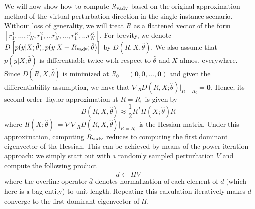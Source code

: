 \documentclass[journal,twoside,web]{ieeecolor}
\begin{document}

We will now show how to compute $R\textsubscript{vadv}$ based on the original
approximation method of the virtual perturbation direction in the
single-instance scenario\cite{Miyato2016a}.
Without loss of generality, we will treat $R$ as a flattened vector of the form
$[r_1^1, \dots, r_{N}^1, r_{1}^2, \dots r_{N}^2, \dots, r_{1}^K, \dots r_{N}^K]$.
For brevity, we denote 
$D\left[p(y|X;\hat{\theta}), p(y|X+R\textsubscript{vadv};\hat{\theta})\right]$ by $D\left(R,X,\hat{\theta}\right)$.
We also assume that $p(y|X; \hat{\theta})$ is differentiable twice with respect to $\hat{\theta}$ and $X$
almost everywhere. Since $D\left(R,X,\hat{\theta}\right)$ is minimized at 
$R_0=\left(\mathbf{0}, \mathbf{0}, \dots, \mathbf{0}\right)$ and given the differentiability
assumption, we have that 
$\nabla_R D(R, X; \hat{\theta}) |_{R=R_0} = \mathbf{0}$.
Hence, its second-order Taylor approximation at $R=R_0$ is given by
\begin{equation}
D\left(R,X,\hat{\theta}\right) \approx \frac{1}{2} R^T H(X; \hat{\theta}) R
\end{equation}
where $H(X; \hat{\theta}) := \nabla\nabla_R D\left(R,X,\hat{\theta}\right) |_{R=R_0}$ 
is the Hessian matrix. Under this approximation,
computing $R\textsubscript{vadv}$ reduces to computing the first dominant eigenvector of the Hessian.
This can be achieved by means of the power-iteration approach: we simply start out
with a randomly sampled perturbation $V$ and compute the following product
\begin{equation}
d \gets \overline{HV}
\end{equation}
where the overline operator $\overline{d}$ denotes normalization 
of each element of $d$ (which here is a bag entity) to unit length.
Repeating this calculation iteratively makes $d$
converge to the first dominant eigenvector of $H$.
\end{document}
